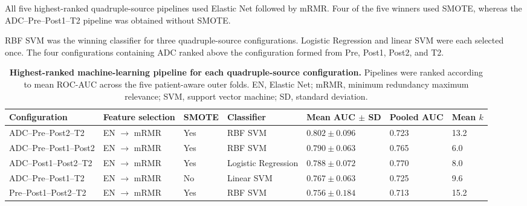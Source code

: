 \documentclass[12pt,twocolumn]{article}
\begin{document}
All five highest-ranked quadruple-source pipelines used Elastic Net
followed by mRMR. Four of the five winners used SMOTE, whereas the
ADC--Pre--Post1--T2 pipeline was obtained without SMOTE.

RBF SVM was the winning classifier for three quadruple-source
configurations. Logistic Regression and linear SVM were each selected
once. The four configurations containing ADC ranked above the
configuration formed from Pre, Post1, Post2, and T2.






\begin{table}[htbp]
\centering
\caption{\textbf{Highest-ranked machine-learning pipeline for each
quadruple-source configuration.}
Pipelines were ranked according to mean ROC-AUC across the five
patient-aware outer folds. EN, Elastic Net; mRMR, minimum redundancy
maximum relevance; SVM, support vector machine; SD, standard
deviation.}
\label{tab:quadruple_source_results}
\small
\begin{tabularx}{\textwidth}{
    p{3.1cm}
    p{2.6cm}
    p{1.1cm}
    p{2.2cm}
    p{2.4cm}
    p{1.8cm}
    X
}
\toprule
\textbf{Configuration} &
\textbf{Feature selection} &
\textbf{SMOTE} &
\textbf{Classifier} &
\textbf{Mean AUC \(\pm\) SD} &
\textbf{Pooled AUC} &
\textbf{Mean \(k\)} \\
\midrule

ADC--Pre--Post2--T2 &
EN \(\rightarrow\) mRMR &
Yes &
RBF SVM &
\(\mathbf{0.802 \pm 0.096}\) &
0.723 &
13.2 \\

ADC--Pre--Post1--Post2 &
EN \(\rightarrow\) mRMR &
Yes &
RBF SVM &
\(0.790 \pm 0.063\) &
0.765 &
6.0 \\

ADC--Post1--Post2--T2 &
EN \(\rightarrow\) mRMR &
Yes &
Logistic Regression &
\(0.788 \pm 0.072\) &
\(\mathbf{0.770}\) &
8.0 \\

ADC--Pre--Post1--T2 &
EN \(\rightarrow\) mRMR &
No &
Linear SVM &
\(0.767 \pm 0.063\) &
0.725 &
9.6 \\

Pre--Post1--Post2--T2 &
EN \(\rightarrow\) mRMR &
Yes &
RBF SVM &
\(0.756 \pm 0.184\) &
0.713 &
15.2 \\

\bottomrule
\end{tabularx}
\end{table}
\end{document}
